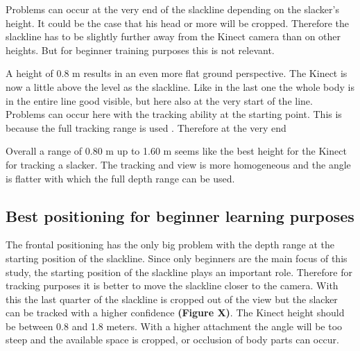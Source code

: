 Problems can occur at the very end of the slackline depending on the slacker’s height. It could be the case that his head or more will be cropped. Therefore the slackline has to be slightly further away from the Kinect camera than on other heights. But for beginner training purposes this is not relevant.

A height of 0.8 m results in an even more flat ground perspective. The Kinect is now a little above the level as the slackline. Like in the last one the whole body is in the entire line good visible, but here also at the very start of the line. Problems can occur here with the tracking ability at the starting point. This is because the full tracking range is used \textbf{}. Therefore at the very end  

Overall a range of 0.80 m up to 1.60 m seems like the best height for the Kinect for tracking a slacker. The tracking and view is more homogeneous and the angle is flatter with which the full depth range can be used.

\subsection{Best positioning for beginner learning purposes}
The frontal positioning has the only big problem with the depth range at the starting position of the slackline. Since only beginners are the main focus of this study, the starting position of the slackline plays an important role. Therefore for tracking purposes it is better to move the slackline closer to the camera. With this the last quarter of the slackline is cropped out of the view but the slacker can be tracked with a higher confidence \textbf{(Figure X)}. The Kinect height should be between 0.8 and 1.8 meters. With a higher attachment the angle will be too steep and the available space is cropped, or occlusion of body parts can occur.

